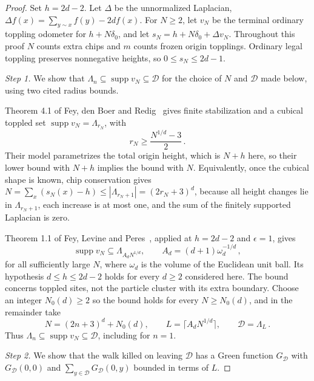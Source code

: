 \documentclass[12pt]{amsart}
\begin{document}
\begin{proof}
Set $h=2d-2$. Let $\Delta$ be the unnormalized Laplacian, $\Delta f(x)=\sum_{y\sim x}f(y)-2df(x)$. For $N\geq2$, let $v_N$ be the terminal ordinary toppling odometer for $h+N\delta_0$, and let $s_N=h+N\delta_0+\Delta v_N$. Throughout this proof $N$ counts extra chips and $m$ counts frozen origin topplings. Ordinary legal toppling preserves nonnegative heights, so $0\leq s_N\leq2d-1$.

\emph{Step 1.} We show that $\Lambda_n\subseteq\operatorname{supp}v_N\subseteq\mathcal D$ for the choice of $N$ and $\mathcal D$ made below, using two cited radius bounds.

Theorem 4.1 of Fey, den Boer and Redig~\cite{fey2008limiting} gives finite stabilization and a cubical toppled set $\operatorname{supp}v_N=\Lambda_{r_N}$, with
\begin{equation*}
 r_N\geq\frac{N^{1/d}-3}{2}\,.
\end{equation*}
Their model parametrizes the total origin height, which is $N+h$ here, so their lower bound with $N+h$ implies the bound with $N$. Equivalently, once the cubical shape is known, chip conservation gives $N=\sum_x(s_N(x)-h)\leq|\Lambda_{r_N+1}|=(2r_N+3)^d$, because all height changes lie in $\Lambda_{r_N+1}$, each increase is at most one, and the sum of the finitely supported Laplacian is zero.

Theorem 1.1 of Fey, Levine and Peres~\cite{fey2010growth}, applied at $h=2d-2$ and $\epsilon=1$, gives
\begin{equation*}
 \operatorname{supp}v_N\subseteq\Lambda_{A_dN^{1/d}},\qquad
 A_d=(d+1)\omega_d^{-1/d}\,,
\end{equation*}
for all sufficiently large $N$, where $\omega_d$ is the volume of the Euclidean unit ball. Its hypothesis $d\leq h\leq2d-2$ holds for every $d\geq2$ considered here. The bound concerns toppled sites, not the particle cluster with its extra boundary. Choose an integer $N_0(d)\geq2$ so the bound holds for every $N\geq N_0(d)$, and in the remainder take
\begin{equation*}
 N=(2n+3)^d+N_0(d),\qquad L=\lceil A_dN^{1/d}\rceil,\qquad \mathcal D=\Lambda_L\,.
\end{equation*}
Thus $\Lambda_n\subseteq\operatorname{supp}v_N\subseteq\mathcal D$, including for $n=1$.

\emph{Step 2.} We show that the walk killed on leaving $\mathcal D$ has a Green function $G_{\mathcal D}$ with $G_{\mathcal D}(0,0)$ and $\sum_{y\in\mathcal D}G_{\mathcal D}(0,y)$ bounded in terms of $L$.


\end{proof}
\end{document}
